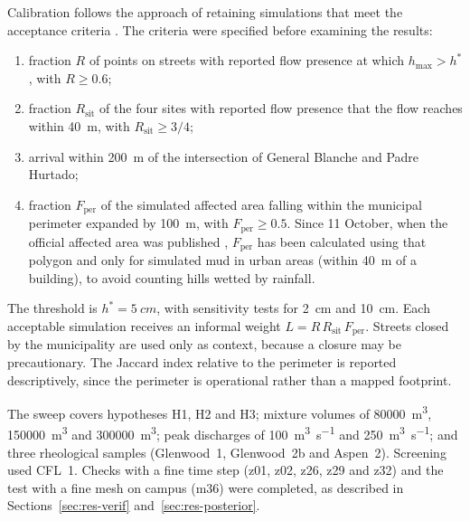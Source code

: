 Calibration follows the approach of retaining simulations that meet the acceptance criteria \citep{beven1992}. The criteria were specified before examining the results:
\begin{enumerate}
\item fraction $R$ of points on streets with reported flow presence at which $h_\mathrm{max}>h^*$, with $R\ge0.6$;
\item fraction $R_\mathrm{sit}$ of the four sites with reported flow presence that the flow reaches within \SI{40}{m}, with $R_\mathrm{sit}\ge3/4$;
\item arrival within \SI{200}{m} of the intersection of General Blanche and Padre Hurtado;
\item fraction $F_\mathrm{per}$ of the simulated affected area falling within the municipal perimeter expanded by \SI{100}{m}, with $F_\mathrm{per}\ge0.5$. Since 11 October, when the official affected area was published \citep{bbnn2026visor}, $F_\mathrm{per}$ has been calculated using that polygon and only for simulated mud in urban areas (within \SI{40}{m} of a building), to avoid counting hills wetted by rainfall.
\end{enumerate}
The threshold is $h^*=\SI{5}{cm}$, with sensitivity tests for \SI{2}{cm} and \SI{10}{cm}. Each acceptable simulation receives an informal weight $L=R\,R_\mathrm{sit}\,F_\mathrm{per}$. Streets closed by the municipality are used only as context, because a closure may be precautionary. The Jaccard index relative to the perimeter is reported descriptively, since the perimeter is operational rather than a mapped footprint.

The sweep covers hypotheses H1, H2 and H3; mixture volumes of \SI{80000}{\metre\cubed}, \SI{150000}{\metre\cubed} and \SI{300000}{\metre\cubed}; peak discharges of \SI{100}{\metre\cubed\per\second} and \SI{250}{\metre\cubed\per\second}; and three rheological samples (Glenwood~1, Glenwood~2b and Aspen~2). Screening used CFL~1. Checks with a fine time step (z01, z02, z26, z29 and z32) and the test with a fine mesh on campus (m36) were completed, as described in Sections~\ref{sec:res-verif} and~\ref{sec:res-posterior}.
